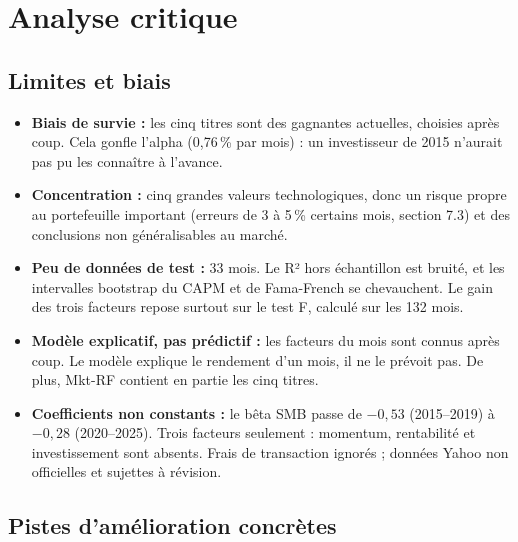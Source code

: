 \documentclass[12pt,a4paper]{article}
\begin{document}
\section*{Analyse critique}

\subsection*{Limites et biais}

\begin{itemize}[leftmargin=*, itemsep=0.5em]
    \item \textbf{Biais de survie :} les cinq titres sont des gagnantes actuelles, choisies après coup. Cela gonfle l'alpha (0,76\,\% par mois) : un investisseur de 2015 n'aurait pas pu les connaître à l'avance.

    \item \textbf{Concentration :} cinq grandes valeurs technologiques, donc un risque propre au portefeuille important (erreurs de 3 à 5\,\% certains mois, section 7.3) et des conclusions non généralisables au marché.

    \item \textbf{Peu de données de test :} 33 mois. Le R² hors échantillon est bruité, et les intervalles bootstrap du CAPM et de Fama-French se chevauchent. Le gain des trois facteurs repose surtout sur le test F, calculé sur les 132 mois.

    \item \textbf{Modèle explicatif, pas prédictif :} les facteurs du mois sont connus après coup. Le modèle explique le rendement d'un mois, il ne le prévoit pas. De plus, Mkt-RF contient en partie les cinq titres.

    \item \textbf{Coefficients non constants :} le bêta SMB passe de $-0{,}53$ (2015--2019) à $-0{,}28$ (2020--2025). Trois facteurs seulement : momentum, rentabilité et investissement sont absents. Frais de transaction ignorés ; données Yahoo non officielles et sujettes à révision.
\end{itemize}

\subsection*{Pistes d'amélioration concrètes}
\end{document}
